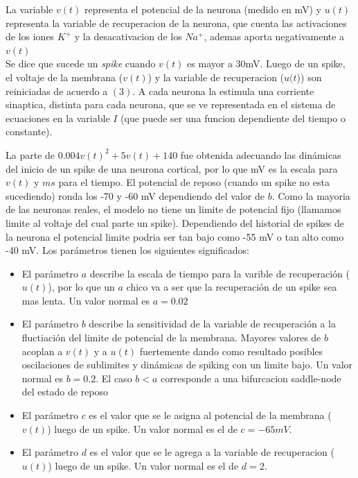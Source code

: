 \documentclass[12pt]{article}
\begin{document}
La variable $v(t)$ representa el potencial de la neurona (medido en mV) y $u(t)$ representa la variable de recuperacion de la neurona,
que cuenta las activaciones de los iones $K^{+}$ y la desacativacion de los $Na^{+}$, ademas aporta negativamente a $v(t)$ \\

Se dice que sucede un \textit{spike} cuando $v(t)$ es mayor a 30mV. Luego de un spike, el voltaje de la membrana ($v(t)$) y la variable de recuperacion ($u(t$)) son reiniciadas de acuerdo a $(3)$.
A cada neurona la estimula una corriente sinaptica, distinta para cada neurona, que se ve representada en el sistema de ecuaciones en la variable $I$ (que puede ser una funcion dependiente del tiempo o constante).

La parte de $0.004v(t)^2 + 5v(t) + 140$ fue obtenida adecuando las dinámicas del inicio de un spike de una neurona cortical, por lo que mV es la escala para $v(t)$ y $ms$ para el tiempo.
El potencial de reposo (cuando un spike no esta sucediendo) ronda los -70 y -60 mV dependiendo del valor de $b$. Como la mayoria de las neuronas reales, el modelo no tiene un limite de potencial fijo (llamamos limite al voltaje del cual parte un spike).
Dependiendo del historial de spikes de la neurona el potencial limite podria ser tan bajo como -55 mV o tan alto como -40 mV.
Los parámetros tienen los siguientes significados:
\begin{itemize}
    \item El parámetro $a$ describe la escala de tiempo para la varible de recuperación ($u(t)$), por lo que un $a$ chico va a ser que la recuperación de un spike sea mas lenta. Un valor normal es $a = 0.02$
    \item El parámetro $b$ describe la sensitividad de la variable de recuperación a la fluctiación del limite de potencial de la membrana. Mayores valores de $b$ acoplan a $v(t)$ y a $u(t)$ fuertemente dando como resultado
posibles oscilaciones de sublimites y dinámicas de spiking con un limite bajo. Un valor normal es $b = 0.2$. El caso $b < a$ corresponde a una bifurcacion saddle-node del estado de reposo \cite{modeloPrimero}
    \item El parámetro $c$ es el valor que se le asigna al potencial de la membrana ($v(t)$) luego de un spike. Un valor normal es el de $c = -65 mV$.
    \item El parámetro $d$ es el valor que se le agrega a la variable de recuperacion ($u(t)$) luego de un spike. Un valor normal es el de $d = 2$.
\end{itemize}
\end{document}
